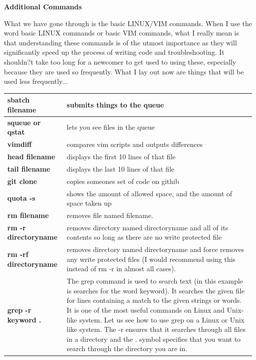 \documentclass{article}
\begin{document}
\textbf{Additional Commands}

What we have gone through is the basic LINUX/VIM commands. When I use the word basic LINUX commands or basic VIM commands, what I really mean is that understanding these commands is of the utmost importance as they will significantly speed up the process of writing code and troubleshooting. It shouldn?t take too long for a newcomer to get used to using these, especially because they are used so frequently. What I lay out now are things that will be used less frequently...

\begin{center}
\begin{tabular*}{\textwidth}{ | p{} | p{}| }
\hline
\textbf{sbatch filename} & submits things to the queue \\
\hline 
\textbf{squeue or qstat} & lets you see files in the queue \\
\hline 
\textbf{vimdiff} & compares vim scripts and outputs differences \\
\hline 
\textbf{head filename} & displays the first 10 lines of that file \\ 
\hline 
\textbf{tail filename} & displays the last 10 lines of that file \\ 
\hline 
\textbf{git clone} & copies someones set of code on githib \\ 
\hline 
\textbf{quota -s} & shows the amount of allowed space, and the amount of space taken up \\ 
\hline
\textbf{rm filename} & removes file named filename. \\ 
\hline
\textbf{rm -r directoryname} & removes directory named directoryname and all of its contents so long as there are no write protected file \\ 
\hline
\textbf{rm -rf directoryname} & removes directory named directoryname and force removes any write protected files (I would recommend using this instead of rm -r in almost all cases). \\ 
\hline 
\textbf{grep -r keyword .} & The grep command is used to search text (in this example is searches for the word keyword). It searches the given file for lines containing a match to the given strings or words. It is one of the most useful commands on Linux and Unix-like system. Let us see how to use grep on a Linux or Unix like system. The -r ensures that it searches through all files in a directory and the . symbol specifies that you want to search through the directory you are in. \\ 
\hline 
\end{tabular*}
\end{center}
\end{document}
